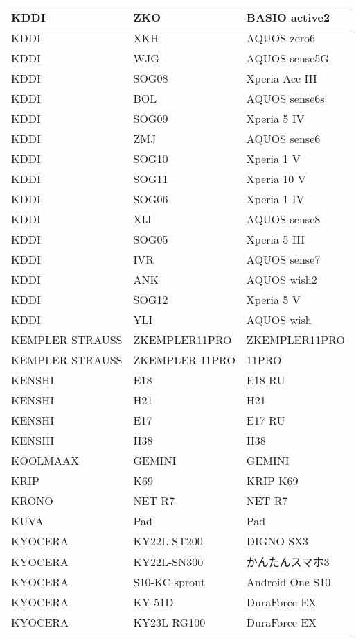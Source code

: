\begin{tabularx}{\linewidth}{|l|X|X|}
        KDDI & ZKO & BASIO active2 \\ \hline
        KDDI & XKH & AQUOS zero6 \\ \hline
        KDDI & WJG & AQUOS sense5G \\ \hline
        KDDI & SOG08 & Xperia Ace III \\ \hline
        KDDI & BOL & AQUOS sense6s \\ \hline
        KDDI & SOG09 & Xperia 5 IV \\ \hline
        KDDI & ZMJ & AQUOS sense6 \\ \hline
        KDDI & SOG10 & Xperia 1 V \\ \hline
        KDDI & SOG11 & Xperia 10 V \\ \hline
        KDDI & SOG06 & Xperia 1 IV \\ \hline
        KDDI & XIJ & AQUOS sense8 \\ \hline
        KDDI & SOG05 & Xperia 5 III \\ \hline
        KDDI & IVR & AQUOS sense7 \\ \hline
        KDDI & ANK & AQUOS wish2 \\ \hline
        KDDI & SOG12 & Xperia 5 V \\ \hline
        KDDI & YLI & AQUOS wish \\ \hline
        KEMPLER STRAUSS & ZKEMPLER11PRO & ZKEMPLER11PRO \\ \hline
        KEMPLER STRAUSS & ZKEMPLER 11PRO & 11PRO \\ \hline
        KENSHI & E18 & E18 RU \\ \hline
        KENSHI & H21 & H21 \\ \hline
        KENSHI & E17 & E17 RU \\ \hline
        KENSHI & H38 & H38 \\ \hline
        KOOLMAAX & GEMINI & GEMINI \\ \hline
        KRIP & K69 & KRIP K69 \\ \hline
        KRONO & NET R7 & NET R7 \\ \hline
        KUVA & Pad & Pad \\ \hline
        KYOCERA & KY22L-ST200 & DIGNO SX3 \\ \hline
        KYOCERA & KY22L-SN300 & かんたんスマホ3 \\ \hline
        KYOCERA & S10-KC sprout & Android One S10 \\ \hline
        KYOCERA & KY-51D & DuraForce EX \\ \hline
        KYOCERA & KY23L-RG100 & DuraForce EX \\ \hline

\end{tabularx}
